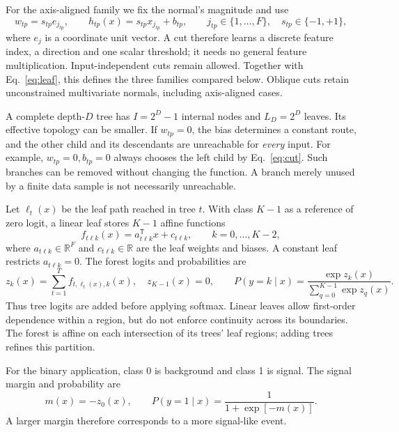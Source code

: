 \documentclass[11pt,a4paper]{article}
\begin{document}
For the axis-aligned family we fix the normal's magnitude and use
\begin{equation}
 w_{tp}=s_{tp}e_{j_{tp}},\qquad
 h_{tp}(x)=s_{tp}x_{j_{tp}}+b_{tp},\qquad
 j_{tp}\in\{1,\ldots,F\},\quad s_{tp}\in\{-1,+1\},
 \label{eq:axis-cut}
\end{equation}
where $e_j$ is a coordinate unit vector. A cut therefore learns a discrete
feature index, a direction and one scalar threshold; it needs no general
feature multiplication. Input-independent cuts remain allowed. Together with
Eq.~\eqref{eq:leaf}, this defines the three families compared below. Oblique
cuts retain unconstrained multivariate normals, including axis-aligned cases.

A complete depth-$D$ tree has $I=2^D-1$ internal nodes and $L_D=2^D$ leaves.
Its effective topology can be smaller. If $w_{tp}=0$, the bias determines a
constant route, and the other child and its descendants are unreachable for
\emph{every} input. For example, $w_{tp}=0,b_{tp}=0$ always chooses the left
child by Eq.~\eqref{eq:cut}. Such branches can be removed without changing the
function. A branch merely unused by a finite data sample is not necessarily
unreachable.

Let $\ell_t(x)$ be the leaf path reached in tree $t$. With class $K-1$ as a
reference of zero logit, a linear leaf stores $K-1$ affine functions
\begin{equation}
 f_{t\ell k}(x)=a_{t\ell k}^{\mathsf T}x+c_{t\ell k},
 \qquad k=0,\ldots,K-2,
 \label{eq:leaf}
\end{equation}
where $a_{t\ell k}\in\mathbb R^F$ and $c_{t\ell k}\in\mathbb R$ are the leaf
weights and biases. A constant leaf restricts $a_{t\ell k}=0$. The forest logits
and probabilities are
\begin{equation}
 z_k(x)=\sum_{t=1}^T f_{t,\ell_t(x),k}(x),\quad z_{K-1}(x)=0,
 \qquad P(y=k\mid x)=\frac{\exp z_k(x)}{\sum_{q=0}^{K-1}\exp z_q(x)}.
 \label{eq:forest}
\end{equation}
Thus tree logits are added before applying softmax. Linear leaves allow
first-order dependence within a region, but do not enforce continuity across
its boundaries. The forest is affine on each intersection of its trees' leaf
regions; adding trees refines this partition.

For the binary application, class 0 is background and class 1 is signal. The
signal margin and probability are
\begin{equation}
 m(x)=-z_0(x),\qquad P(y=1\mid x)=\frac{1}{1+\exp[-m(x)]}.
 \label{eq:margin}
\end{equation}
A larger margin therefore corresponds to a more signal-like event.
\end{document}
